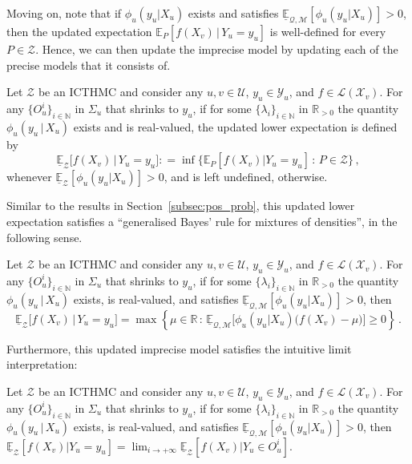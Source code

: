 \documentclass[twoside,11pt]{article}
\newcommand{\nats}{\mathbb{N}}
\newcommand{\reals}{\mathbb{R}}
\newcommand{\realspos}{\reals_{>0}}
\newcommand{\states}{\mathcal{X}}
\newcommand{\observs}{\mathcal{Y}}
\newcommand{\lexp}{\underline{\mathbb{E}}_{\rateset,\mathcal{M}}}
\newcommand{\gambles}{\mathcal{L}}
\newcommand{\rateset}{\mathcal{Q}}
\newcommand{\coloneqq}{:\!=}
\begin{document}
Moving on, note that if $\phi_u(y_u\vert X_u)$ exists and satisfies $\lexp[\phi_u(y_u\vert X_u)]>0$, then the updated expectation $\mathbb{E}_P[f(X_v)\,\vert\,Y_u=y_u]$ is well-defined for every $P\in\mathcal{Z}$. Hence, we can then update the imprecise model by updating each of the precise models that it consists of.
\begin{definition}\label{def:reg_ext_densities}
Let $\mathcal{Z}$ be an ICTHMC and consider any $u,v\in\mathcal{U}$, $y_u\in\observs_u$, and $f\in\gambles(\states_v)$. For any $\{O_u^i\}_{i\in\nats}$ in $\Sigma_u$ that shrinks to $y_u$, if for some $\{\lambda_i\}_{i\in\nats}$ in $\realspos$ the quantity $\phi_u(y_u\,\vert\,X_u)$ exists and is real-valued, the updated lower expectation is defined by
\begin{equation*}
\underline{\mathbb{E}}_{\mathcal{Z}}\bigl[f(X_v)\,\vert\,Y_u = y_u\bigr] \coloneqq \inf\{\mathbb{E}_P[f(X_v)\vert Y_u=y_u]\,:\,P\in\mathcal{Z}\}\,,
\end{equation*}
whenever $\underline{\mathbb{E}}_\mathcal{Z}[\phi_u(y_u\vert X_u)] >0$, and is left undefined, otherwise.
\end{definition}

Similar to the results in Section~\ref{subsec:pos_prob}, this updated lower expectation satisfies a ``generalised Bayes' rule for mixtures of densities'', in the following sense.

\begin{proposition}\label{prop:GBR_for_densities_lower_zero}
Let $\mathcal{Z}$ be an ICTHMC and consider any $u,v\in\mathcal{U}$, $y_u\in\observs_u$, and $f\in\gambles(\states_v)$. For any $\{O_u^i\}_{i\in\nats}$ in $\Sigma_u$ that shrinks to $y_u$, if for some $\{\lambda_i\}_{i\in\nats}$ in $\realspos$ the quantity $\phi_u(y_u\,\vert\,X_u)$ exists, is real-valued, and satisfies $\lexp[\phi_u(y_u\vert X_u)]>0$, then
\begin{equation}\label{eq:gbr_densities}
\underline{\mathbb{E}}_{\mathcal{Z}}\bigl[f(X_v)\,\vert\,Y_u = y_u\bigr] = \max\left\{\mu\in\reals\,:\, \lexp\bigl[\phi_u(y_u\vert X_u)\bigl(f(X_v) - \mu\bigr)\bigr] \geq 0\right\}\,.
\end{equation}
\end{proposition}
Furthermore, this updated imprecise model satisfies the intuitive limit interpretation:
\begin{proposition}\label{prop:GBR_for_densities_is_limit_if_continuous}
Let $\mathcal{Z}$ be an ICTHMC and consider any $u,v\in\mathcal{U}$, $y_u\in\observs_u$, and $f\in\gambles(\states_v)$. For any $\{O_u^i\}_{i\in\nats}$ in $\Sigma_u$ that shrinks to $y_u$, if for some $\{\lambda_i\}_{i\in\nats}$ in $\realspos$ the quantity $\phi_u(y_u\,\vert\,X_u)$ exists, is real-valued, and satisfies $\lexp[\phi_u(y_u\vert X_u)]>0$, then $\underline{\mathbb{E}}_\mathcal{Z}[f(X_v)\vert Y_u=y_u] 
 = \lim_{i\to+\infty}\underline{\mathbb{E}}_\mathcal{Z}[f(X_v)\vert Y_u\in O_u^i]$.
\end{proposition}
\end{document}
